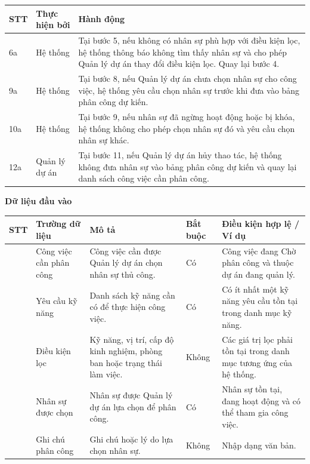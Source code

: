 \documentclass[../DoAn.tex]{subfiles}
\begin{document}
{\ucTableText
\begin{longtable}{|>{\centering\arraybackslash}p{}|p{}|p{}|}
\hline
\rowcolor{ucHeaderBg}\textbf{STT} & \textbf{Thực hiện bởi} & \textbf{Hành động} \\ \hline
6a & Hệ thống & Tại bước 5, nếu không có nhân sự phù hợp với điều kiện lọc, hệ thống thông báo không tìm thấy nhân sự và cho phép Quản lý dự án thay đổi điều kiện lọc. Quay lại bước 4. \\ \hline
9a & Hệ thống & Tại bước 8, nếu Quản lý dự án chưa chọn nhân sự cho công việc, hệ thống yêu cầu chọn nhân sự trước khi đưa vào bảng phân công dự kiến. \\ \hline
10a & Hệ thống & Tại bước 9, nếu nhân sự đã ngừng hoạt động hoặc bị khóa, hệ thống không cho phép chọn nhân sự đó và yêu cầu chọn nhân sự khác. \\ \hline
12a & Quản lý dự án & Tại bước 11, nếu Quản lý dự án hủy thao tác, hệ thống không đưa nhân sự vào bảng phân công dự kiến và quay lại danh sách công việc cần phân công. \\ \hline
\end{longtable}
}

\textbf{Dữ liệu đầu vào}

{\ucDataText
\begin{longtable}{|>{\centering\arraybackslash}p{}|>{\raggedright\arraybackslash}p{}|>{\raggedright\arraybackslash}p{}|>{\raggedright\arraybackslash}p{}|>{\raggedright\arraybackslash}p{}|}
\hline
\rowcolor{ucHeaderBg}\textbf{STT} & \textbf{Trường dữ liệu} & \textbf{Mô tả} & \textbf{Bắt buộc} & \textbf{Điều kiện hợp lệ / Ví dụ} \\ \hline
1 & Công việc cần phân công & Công việc cần được Quản lý dự án chọn nhân sự thủ công. & Có & Công việc đang Chờ phân công và thuộc dự án đang quản lý. \\ \hline
2 & Yêu cầu kỹ năng & Danh sách kỹ năng cần có để thực hiện công việc. & Có & Có ít nhất một kỹ năng yêu cầu tồn tại trong danh mục kỹ năng. \\ \hline
3 & Điều kiện lọc & Kỹ năng, vị trí, cấp độ kinh nghiệm, phòng ban hoặc trạng thái làm việc. & Không & Các giá trị lọc phải tồn tại trong danh mục tương ứng của hệ thống. \\ \hline
4 & Nhân sự được chọn & Nhân sự được Quản lý dự án lựa chọn để phân công. & Có & Nhân sự tồn tại, đang hoạt động và có thể tham gia công việc. \\ \hline
5 & Ghi chú phân công & Ghi chú hoặc lý do lựa chọn nhân sự. & Không & Nhập dạng văn bản. \\ \hline
\end{longtable}
}
\end{document}
